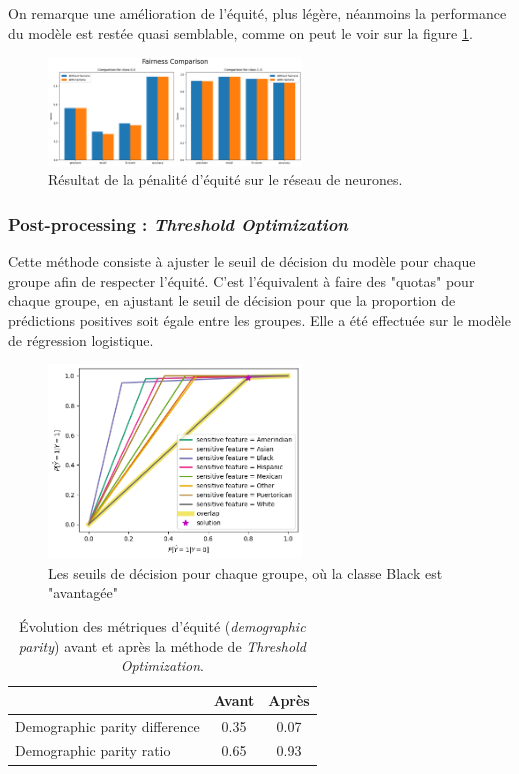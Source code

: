 \documentclass[12pt, letterpaper]{article}
\begin{document}
On remarque une amélioration de l'équité, plus légère, néanmoins la performance du modèle est restée quasi semblable, comme on peut le voir sur la figure \ref{fig:inprocessing}.

\begin{figure}[h]
    \centering
    \includegraphics[width=0.6\textwidth]{inprocessing}
    \caption{Résultat de la pénalité d'équité sur le réseau de neurones.}
    \label{fig:inprocessing}
\end{figure}

\subsubsection*{{Post-processing : \emph{Threshold Optimization}}}
Cette méthode consiste à ajuster le seuil de décision du modèle pour chaque groupe afin de respecter l'équité.
C'est l'équivalent à faire des "quotas" pour chaque groupe, en ajustant le seuil de décision pour que la proportion de prédictions positives soit égale entre les groupes.
Elle a été effectuée sur le modèle de régression logistique.

\begin{figure}
    \centering
    \includegraphics[width=0.6\textwidth]{threshold_opti}
    \caption{Les seuils de décision pour chaque groupe, où la classe Black est "avantagée"}
    \label{fig:threshold_opti}
\end{figure}

\begin{table}[h!]
    \centering
    \begin{tabular}{lcc}
        \hline
        & \textbf{Avant} & \textbf{Après} \\
        \hline
        Demographic parity difference & 0.35 & 0.07 \\
        Demographic parity ratio      & 0.65 & 0.93 \\
        \hline
    \end{tabular}
    \caption{Évolution des métriques d'équité (\emph{demographic parity}) avant et après la méthode de \emph{Threshold Optimization}.}
\end{table}
\end{document}
